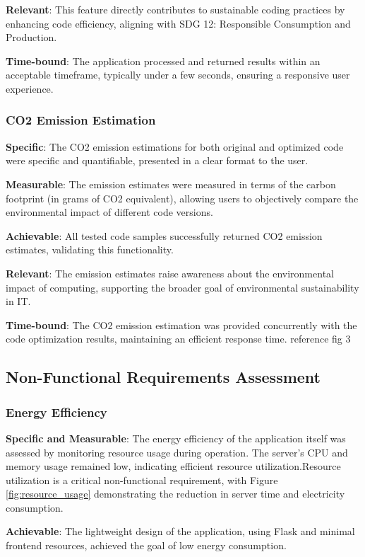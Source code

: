 \documentclass[conference,compsoc]{IEEEtran}
\begin{document}
\textbf{Relevant}: This feature directly contributes to sustainable coding practices by enhancing code efficiency, aligning with SDG 12: Responsible Consumption and Production.

\textbf{Time-bound}: The application processed and returned results within an acceptable timeframe, typically under a few seconds, ensuring a responsive user experience.

\subsubsection{CO2 Emission Estimation}
\textbf{Specific}: The CO2 emission estimations for both original and optimized code were specific and quantifiable, presented in a clear format to the user.

\textbf{Measurable}: The emission estimates were measured in terms of the carbon footprint (in grams of CO2 equivalent), allowing users to objectively compare the environmental impact of different code versions.

\textbf{Achievable}: All tested code samples successfully returned CO2 emission estimates, validating this functionality.

\textbf{Relevant}: The emission estimates raise awareness about the environmental impact of computing, supporting the broader goal of environmental sustainability in IT.

\textbf{Time-bound}: The CO2 emission estimation was provided concurrently with the code optimization results, maintaining an efficient response time. reference fig 3

\subsection{Non-Functional Requirements Assessment}
\subsubsection{Energy Efficiency}
\textbf{Specific and Measurable}: The energy efficiency of the application itself was assessed by monitoring resource usage during operation. The server's CPU and memory usage remained low, indicating efficient resource utilization.Resource utilization is a critical non-functional requirement, with Figure \ref{fig:resource_usage} demonstrating the reduction in server time and electricity consumption.

\textbf{Achievable}: The lightweight design of the application, using Flask and minimal frontend resources, achieved the goal of low energy consumption.
\end{document}
